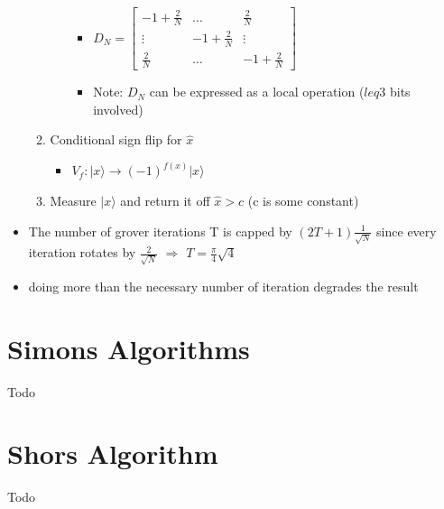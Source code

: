 \documentclass[12pt,a4paper]{article}
\newcommand{\ket}[1]{\vert #1 \rangle}
\begin{document}
\begin{itemize}
\begin{enumerate}
\begin{enumerate}
\begin{itemize}
\item $D_N = \begin{bmatrix} -1 + \frac{2}{N} & \dots & \frac{2}{N} \\ \vdots & -1 + \frac{2}{N}& \vdots\\  \frac{2}{N} & \dots & -1 + \frac{2}{N}\end{bmatrix}$
\item Note: $D_N$ can be expressed as a local operation ($leq 3$ bits involved)
\end{itemize}
\end{enumerate}
\item Conditional sign flip for $\hat{x}$
\begin{itemize}
\item $V_f : \ket{x} \rightarrow (-1)^{f(x)}\ket{x}$
\end{itemize}
\item Measure $\ket{x}$ and return it off $\hat{x}>c$ (c is some constant)
\end{enumerate}
\item The number of grover iterations T is capped by $(2T+1)\frac{1}{\sqrt{N}}$ since every iteration rotates by $\frac{2}{\sqrt{N}}$ $\Rightarrow$ $T=\frac{\pi}{4}\sqrt{4}$
\item doing more than the necessary number of iteration degrades the result
\end{itemize}

\section{Simons Algorithms}
Todo

\section{Shors Algorithm}
Todo
\end{document}
